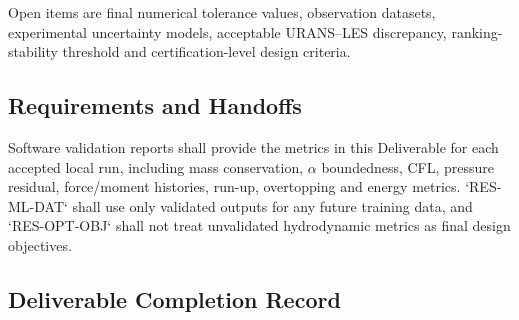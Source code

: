 
Open items are final numerical tolerance values, observation datasets,
experimental uncertainty models, acceptable URANS--LES discrepancy,
ranking-stability threshold and certification-level design criteria.

\subsection{Requirements and Handoffs}
\label{sec:res-ver-met-requirements}


Software validation reports shall provide the metrics in this
Deliverable for each accepted local run, including mass conservation,
$\alpha$ boundedness, CFL, pressure residual, force/moment histories,
run-up, overtopping and energy metrics. `RES-ML-DAT` shall use only
validated outputs for any future training data, and `RES-OPT-OBJ`
shall not treat unvalidated hydrodynamic metrics as final design
objectives.

\subsection{Deliverable Completion Record}
\label{sec:res-ver-met-completion-record}

%
%
%
